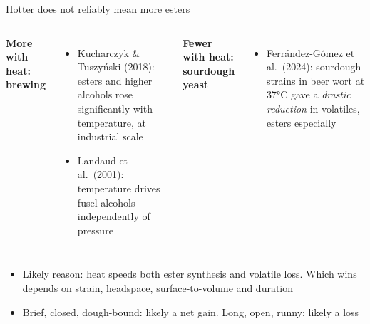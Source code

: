 \documentclass[aspectratio=169,11pt]{beamer}
\begin{document}
\begin{frame}{Hotter does not reliably mean more esters \contested}
  \begin{columns}[T]
      {\color{crust}\textbf{More with heat: brewing}}
      \begin{itemize}\footnotesize
        \item Kucharczyk \& Tuszyński (2018): esters and higher alcohols rose
          significantly with temperature, at industrial scale
        \item Landaud et al.\ (2001): temperature drives fusel alcohols independently
          of pressure
      \end{itemize}
      {\color{crust}\textbf{Fewer with heat: sourdough yeast}}
      \begin{itemize}\footnotesize
        \item Ferrández-Gómez et al.\ (2024): sourdough strains in beer wort at 37°C gave
          a \emph{drastic reduction} in volatiles, esters especially
      \end{itemize}
  \end{columns}
  \medskip
  \begin{itemize}
    \item Likely reason: heat speeds both ester synthesis and volatile loss. Which wins
      depends on strain, headspace, surface-to-volume and duration
    \item Brief, closed, dough-bound: likely a net gain. Long, open, runny: likely a loss
  \end{itemize}
\end{frame}
\end{document}
